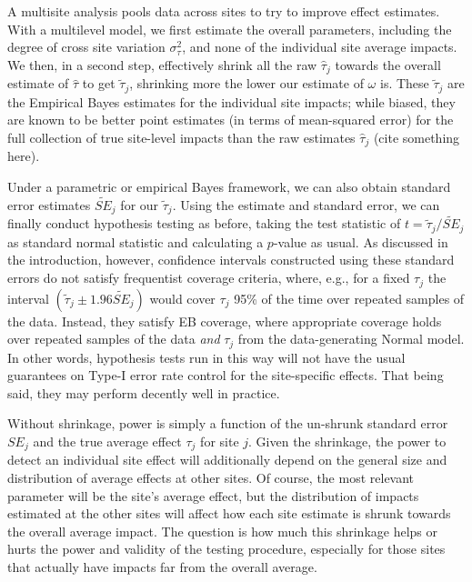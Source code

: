 \documentclass[]{article}
\begin{document}
A multisite analysis pools data across sites to try to improve effect estimates.
With a multilevel model, we first estimate the overall parameters, including the degree of cross site variation $\sigma^2_\tau$, and none of the individual site average impacts.
We then, in a second step, effectively shrink all the raw $\hat{\tau}_j$ towards the overall estimate of $\hat{\tau}$ to get $\tilde{\tau}_j$, shrinking more the lower our estimate of $\omega$ is.
These $\tilde{\tau}_j$ are the Empirical Bayes estimates for the individual site impacts; while biased, they are known to be better point estimates (in terms of mean-squared error) for the full collection of true site-level impacts than the raw estimates $\hat{\tau}_j$ (cite something here).

Under a parametric or empirical Bayes framework, we can also obtain standard error estimates $\tilde{SE}_j$ for our $\tilde{\tau}_j$.
Using the estimate and standard error, we can finally conduct hypothesis testing as before, taking the test statistic of $t = \tilde{\tau}_j / \tilde{SE}_j$ as standard normal statistic and calculating a $p$-value as usual.
As discussed in the introduction, however, confidence intervals constructed using these standard errors do not satisfy frequentist coverage criteria, where, e.g., for a fixed $\tau_j$ the interval $(\tilde{\tau}_j \pm 1.96 \tilde{SE}_j)$ would cover $\tau_j$ 95\% of the time over repeated samples of the data.
Instead, they satisfy EB coverage, where appropriate coverage holds over repeated samples of the data \textit{and} $\tau_j$ from the data-generating Normal model.
In other words, hypothesis tests run in this way will not have the usual guarantees on Type-I error rate control for the site-specific effects.
That being said, they may perform decently well in practice.

Without shrinkage, power is simply a function of the un-shrunk standard error $SE_j$ and the true average effect $\tau_j$ for site $j$.
Given the shrinkage, the power to detect an individual site effect will additionally depend on the general size and distribution of average effects at other sites.
Of course, the most relevant parameter will be the site's average effect, but the distribution of impacts estimated at the other sites will affect how each site estimate is shrunk towards the overall average impact.
The question is how much this shrinkage helps or hurts the power and validity of the testing procedure, especially for those sites that actually have impacts far from the overall average.
\end{document}
